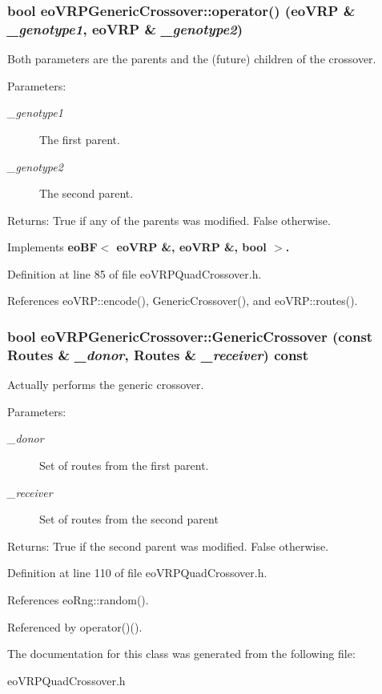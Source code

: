 \subsubsection{\setlength{\rightskip}{0pt plus 5cm}bool eo\-VRPGeneric\-Crossover::operator() (\bf{eo\-VRP} \& {\em \_\-genotype1}, \bf{eo\-VRP} \& {\em \_\-genotype2})\hspace{0.3cm}{\tt  [inline, virtual]}}\label{classeo_v_r_p_generic_crossover_d7d3b19562b071bd50dd4d831e447d0c}


Both parameters are the parents and the (future) children of the crossover. 

\begin{Desc}
\item[Parameters:]
\begin{description}
\item[{\em \_\-genotype1}]The first parent. \item[{\em \_\-genotype2}]The second parent. \end{description}
\end{Desc}
\begin{Desc}
\item[Returns:]True if any of the parents was modified. False otherwise. \end{Desc}


Implements \bf{eo\-BF$<$ eo\-VRP \&, eo\-VRP \&, bool $>$}.

Definition at line 85 of file eo\-VRPQuad\-Crossover.h.

References eo\-VRP::encode(), Generic\-Crossover(), and eo\-VRP::routes().
\subsubsection{\setlength{\rightskip}{0pt plus 5cm}bool eo\-VRPGeneric\-Crossover::Generic\-Crossover (const Routes \& {\em \_\-donor}, Routes \& {\em \_\-receiver}) const\hspace{0.3cm}{\tt  [inline, private]}}\label{classeo_v_r_p_generic_crossover_543ba6869b93a3f9f709045b7e24d74a}


Actually performs the generic crossover. 

\begin{Desc}
\item[Parameters:]
\begin{description}
\item[{\em \_\-donor}]Set of routes from the first parent. \item[{\em \_\-receiver}]Set of routes from the second parent \end{description}
\end{Desc}
\begin{Desc}
\item[Returns:]True if the second parent was modified. False otherwise. \end{Desc}


Definition at line 110 of file eo\-VRPQuad\-Crossover.h.

References eo\-Rng::random().

Referenced by operator()().

The documentation for this class was generated from the following file:\begin{CompactItemize}
\item 
eo\-VRPQuad\-Crossover.h\end{CompactItemize}
